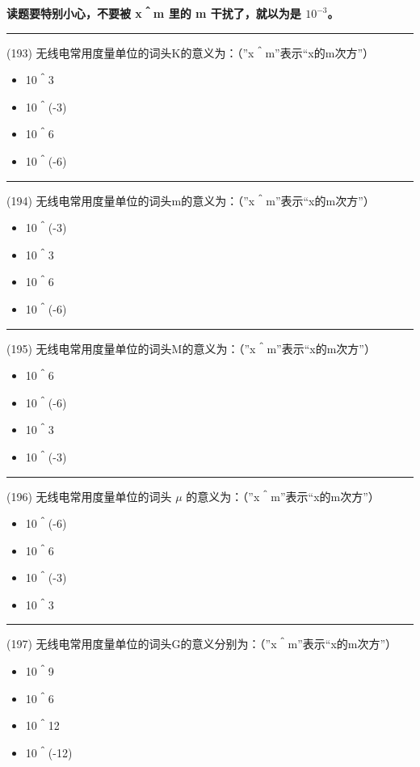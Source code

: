 \documentclass[twocolumn,hyperref,UTF8]{ctexart}  %
\begin{document}
{\color{red} \textbf{读题要特别小心，不要被 x＾m 里的 m 干扰了，就以为是 $10^{-3}$。}}


\noindent\rule{0.5\textwidth}{1pt}
\heiti (193) 无线电常用度量单位的词头K的意义为：（”x＾m”表示“x的m次方”） \songti {\color{gray} [LK0466] }
\begin{itemize}
	\item  10＾3
	\item  10＾(-3)
	\item  10＾6
	\item  10＾(-6)
\end{itemize}


\noindent\rule{0.5\textwidth}{1pt}
\heiti (194) 无线电常用度量单位的词头m的意义为：（”x＾m”表示“x的m次方”） \songti {\color{gray} [LK0467] }
\begin{itemize}
	\item  10＾(-3)
	\item  10＾3
	\item  10＾6
	\item  10＾(-6)
\end{itemize}


\noindent\rule{0.5\textwidth}{1pt}
\heiti (195) 无线电常用度量单位的词头M的意义为：（”x＾m”表示“x的m次方”） \songti {\color{gray} [LK0468] }
\begin{itemize}
	\item  10＾6
	\item  10＾(-6)
	\item  10＾3
	\item  10＾(-3)
\end{itemize}


\noindent\rule{0.5\textwidth}{1pt}
\heiti (196) 无线电常用度量单位的词头 $\mu$ 的意义为：（”x＾m”表示“x的m次方”） \songti {\color{gray} [LK0469] }
\begin{itemize}
	\item  10＾(-6)
	\item  10＾6
	\item  10＾(-3)
	\item  10＾3
\end{itemize}


\noindent\rule{0.5\textwidth}{1pt}
\heiti (197) 无线电常用度量单位的词头G的意义分别为：（”x＾m”表示“x的m次方”） \songti {\color{gray} [LK0470] }
\begin{itemize}
	\item  10＾9
	\item  10＾6
	\item  10＾12
	\item  10＾(-12)
\end{itemize}
\end{document}
